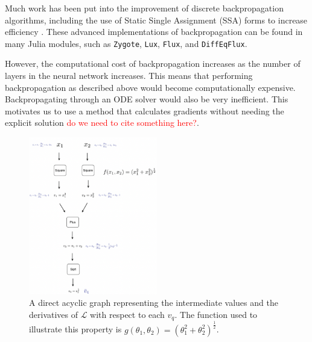 \documentclass[a4paper,11pt,titlepage]{article}
\theoremstyle{definition}
\theoremstyle{plain}
\theoremstyle{remark}
\begin{document}
Much work has been put into the improvement of discrete backpropagation algorithms, including the use of Static Single Assignment (SSA) forms to increase efficiency \cite{innes2019}. These advanced implementations of backpropagation can be found in many Julia modules, such as \texttt{Zygote}, \texttt{Lux}, \texttt{Flux}, and \texttt{DiffEqFlux}. %


However, the computational cost of backpropagation increases as the number of layers in the neural network increases. This means that performing backpropagation as described above would become computationally expensive. Backpropagating through an ODE solver would also be very inefficient. This motivates us to use a method that calculates gradients without needing the explicit solution \textcolor{red}{do we need to cite something here?}.

\begin{figure}\label{discretebackprop}
    \centering
    \includegraphics[width=0.5\textwidth]{report/figures/backpropdiscrete.png}
    \caption{A direct acyclic graph representing the intermediate values and the derivatives of $\mathcal{L}$ with respect to each $v_q$. The function used to illustrate this property is $g(\theta_1, \theta_2) = (\theta_1^2 + \theta_2^2)^\frac{1}{2}$.}
    \label{fig:discretebackprop}
\end{figure}
\end{document}
